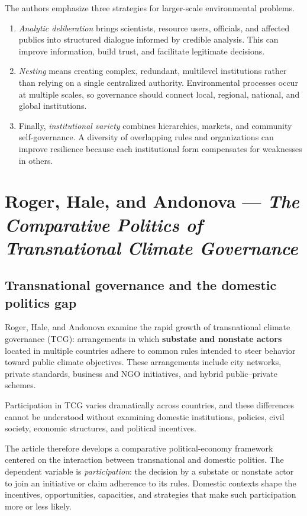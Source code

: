 The authors emphasize three strategies for larger-scale environmental problems.

\begin{enumerate}
    \item \textit{Analytic deliberation} brings scientists, resource users, officials, and affected publics into structured dialogue informed by credible analysis. This can improve information, build trust, and facilitate legitimate decisions.
    
    \item \textit{Nesting} means creating complex, redundant, multilevel institutions rather than relying on a single centralized authority. Environmental processes occur at multiple scales, so governance should connect local, regional, national, and global institutions.
    
    \item Finally, \textit{institutional variety} combines hierarchies, markets, and community self-governance. A diversity of overlapping rules and organizations can improve resilience because each institutional form compensates for weaknesses in others.
\end{enumerate}

\clearpage
\section{Roger, Hale, and Andonova --- \textit{The Comparative Politics of Transnational Climate Governance}}

\subsection{Transnational governance and the domestic politics gap}

Roger, Hale, and Andonova examine the rapid growth of transnational climate governance (TCG): arrangements in which \textbf{substate and nonstate actors} located in multiple countries adhere to common rules intended to steer behavior toward public climate objectives. These arrangements include city networks, private standards, business and NGO initiatives, and hybrid public--private schemes.

Participation in TCG varies dramatically across countries, and these differences cannot be understood without examining domestic institutions, policies, civil society, economic structures, and political incentives.

The article therefore develops a comparative political-economy framework centered on the interaction between transnational and domestic politics. The dependent variable is \textit{participation}: the decision by a substate or nonstate actor to join an initiative or claim adherence to its rules. Domestic contexts shape the incentives, opportunities, capacities, and strategies that make such participation more or less likely.

